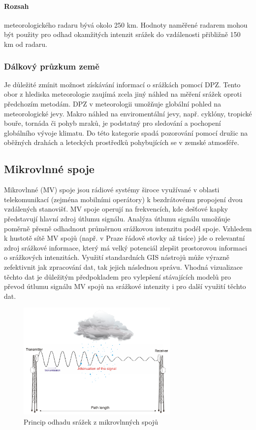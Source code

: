 \documentclass[a4paper,12pt,oneside]{report}
\begin{document}
\paragraph*{Rozsah} meteorologického radaru bývá okolo 250 km. Hodnoty naměřené radarem mohou být použity pro odhad okamžitých intenzit srážek do vzdálenosti přibližně 150 km od radaru.\cite{kohout}

\subsubsection{Dálkový průzkum země}
Je důležité zmínit možnost získávání informací o srážkách pomocí \acs{DPZ}. Tento obor z hlediska meteorologie zaujímá zcela jiný náhled na měření srážek oproti předchozím metodám. \acs{DPZ} v meteorologii umožňuje globální pohled na meteorologické jevy. Makro náhled na enviromentální jevy, např. cyklóny, tropické bouře, tornáda či pohyb mraků, je podstatný pro sledování a pochopení globálního vývoje klimatu. Do této kategorie spadá pozorování pomocí družic na oběžných drahách a leteckých prostředků pohybujících se v zemské atmosféře. 


\subsection{Mikrovlnné spoje}
Mikrovlnné (MV) spoje jsou rádiové systémy široce využívané v oblasti telekomunikací (zejména 
mobilními operátory) k bezdrátovému propojení dvou vzdálených stanovišť. MV spoje operují na 
frekvencích, kde dešťové kapky představují hlavní zdroj útlumu signálu. Analýza útlumu signálu 
umožňuje poměrně přesně odhadnout průměrnou srážkovou intenzitu podél spoje. Vzhledem 
k hustotě sítě MV spojů (např. v Praze řádově stovky až tisíce) jde o relevantní zdroj srážkové 
informace, který má velký potenciál zlepšit prostorovou informaci o srážkových intenzitách. Využití 
standardních GIS nástrojů může výrazně zefektivnit jak zpracování dat, tak jejich následnou správu. 
Vhodná vizualizace těchto dat je důležitým předpokladem pro vylepšení stávajících modelů pro 
převod útlumu signálu MV spojů na srážkové intenzity i pro další využití těchto dat.
 
\begin{figure}[h!]
    \centering
    \includegraphics[width=0.7\textwidth]{./img/srazky/microwave_link.png}
    \caption[MV linky]{\centering  Princip odhadu srážek z mikrovlnných spojů }
 \end{figure}   
\end{document}

